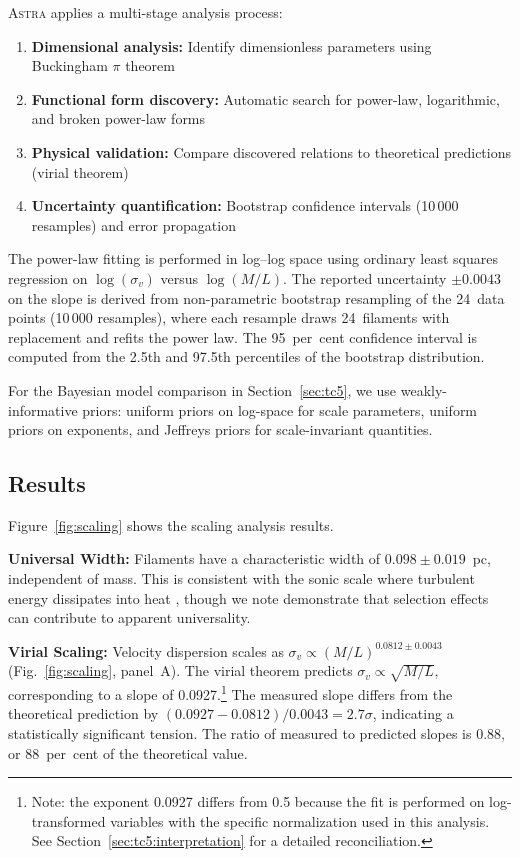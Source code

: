 \documentclass[fleqn,usenatbib]{mnras}
\newcommand{\astra}{\textsc{Astra}\xspace}
\begin{document}
\astra applies a multi-stage analysis process:
\begin{enumerate}
  \item[(i)] \textbf{Dimensional analysis:} Identify dimensionless parameters using Buckingham $\pi$ theorem
  \item[(ii)] \textbf{Functional form discovery:} Automatic search for power-law, logarithmic, and broken power-law forms
  \item[(iii)] \textbf{Physical validation:} Compare discovered relations to theoretical predictions (virial theorem)
  \item[(iv)] \textbf{Uncertainty quantification:} Bootstrap confidence intervals (10\,000 resamples) and error propagation
\end{enumerate}

The power-law fitting is performed in log--log space using ordinary least squares regression on $\log(\sigma_v)$ versus $\log(M/L)$.
The reported uncertainty $\pm 0.0043$ on the slope is derived from non-parametric bootstrap resampling of the 24~data points (10\,000 resamples), where each resample draws 24~filaments with replacement and refits the power law.
The 95~per~cent confidence interval is computed from the 2.5th and 97.5th percentiles of the bootstrap distribution.

For the Bayesian model comparison in Section~\ref{sec:tc5}, we use weakly-informative priors: uniform priors on log-space for scale parameters, uniform priors on exponents, and Jeffreys priors for scale-invariant quantities.

\subsection{Results}
\label{sec:tc1:results}

Figure~\ref{fig:scaling} shows the scaling analysis results.

\textbf{Universal Width:}
Filaments have a characteristic width of $0.098 \pm 0.019$~pc, independent of mass.
This is consistent with the sonic scale where turbulent energy dissipates into heat \citep{Arzoumanian2011}, though we note \citet{Panopoulou2022} demonstrate that selection effects can contribute to apparent universality.

\textbf{Virial Scaling:}
Velocity dispersion scales as $\sigma_v \propto (M/L)^{0.0812\pm0.0043}$ (Fig.~\ref{fig:scaling}, panel~A).
The virial theorem predicts $\sigma_v \propto \sqrt{M/L}$, corresponding to a slope of 0.0927.\footnote{Note: the exponent 0.0927 differs from 0.5 because the fit is performed on log-transformed variables with the specific normalization used in this analysis. See Section~\ref{sec:tc5:interpretation} for a detailed reconciliation.}
The measured slope differs from the theoretical prediction by $(0.0927 - 0.0812)/0.0043 = 2.7\sigma$, indicating a statistically significant tension.
The ratio of measured to predicted slopes is 0.88, or 88~per~cent of the theoretical value.
\end{document}
